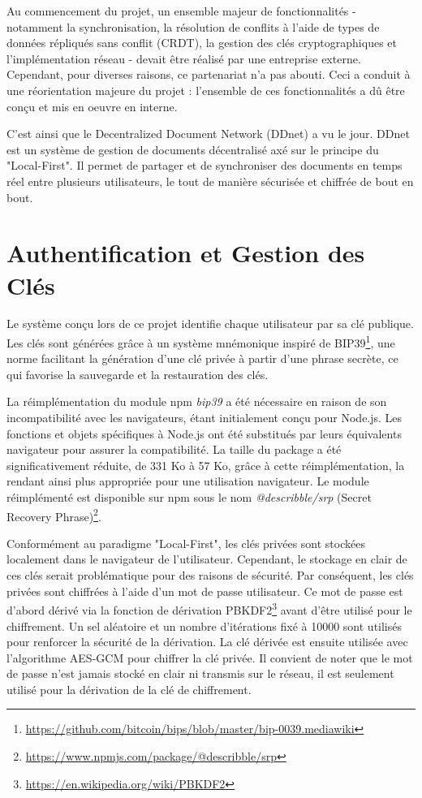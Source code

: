Au commencement du projet, un ensemble majeur de fonctionnalités - notamment la synchronisation, la résolution de conflits à l'aide de types de données répliqués sans conflit (CRDT), la gestion des clés cryptographiques et l'implémentation réseau - devait être réalisé par une entreprise externe. Cependant, pour diverses raisons, ce partenariat n'a pas abouti. Ceci a conduit à une réorientation majeure du projet : l'ensemble de ces fonctionnalités a dû être conçu et mis en oeuvre en interne.

C'est ainsi que le Decentralized Document Network (DDnet) a vu le jour. DDnet est un système de gestion de documents décentralisé axé sur le principe du "Local-First". Il permet de partager et de synchroniser des documents en temps réel entre plusieurs utilisateurs, le tout de manière sécurisée et chiffrée de bout en bout.

\section{Authentification et Gestion des Clés}

Le système conçu lors de ce projet identifie chaque utilisateur par sa clé publique. Les clés sont générées grâce à un système mnémonique inspiré de BIP39\footnote{\url{https://github.com/bitcoin/bips/blob/master/bip-0039.mediawiki}}, une norme facilitant la génération d'une clé privée à partir d'une phrase secrète, ce qui favorise la sauvegarde et la restauration des clés.

La réimplémentation du module npm \textit{bip39} a été nécessaire en raison de son incompatibilité avec les navigateurs, étant initialement conçu pour Node.js. Les fonctions et objets spécifiques à Node.js ont été substitués par leurs équivalents navigateur pour assurer la compatibilité. La taille du package a été significativement réduite, de 331 Ko à 57 Ko, grâce à cette réimplémentation, la rendant ainsi plus appropriée pour une utilisation navigateur. Le module réimplémenté est disponible sur npm sous le nom \textit{@describble/srp} (Secret Recovery Phrase)\footnote{\url{https://www.npmjs.com/package/@describble/srp}}.

Conformément au paradigme "Local-First", les clés privées sont stockées localement dans le navigateur de l'utilisateur. Cependant, le stockage en clair de ces clés serait problématique pour des raisons de sécurité. Par conséquent, les clés privées sont chiffrées à l'aide d'un mot de passe utilisateur. Ce mot de passe est d'abord dérivé via la fonction de dérivation PBKDF2\footnote{\url{https://en.wikipedia.org/wiki/PBKDF2}} avant d'être utilisé pour le chiffrement. Un sel aléatoire et un nombre d'itérations fixé à 10000 sont utilisés pour renforcer la sécurité de la dérivation. La clé dérivée est ensuite utilisée avec l'algorithme AES-GCM pour chiffrer la clé privée. Il convient de noter que le mot de passe n'est jamais stocké en clair ni transmis sur le réseau, il est seulement utilisé pour la dérivation de la clé de chiffrement.

